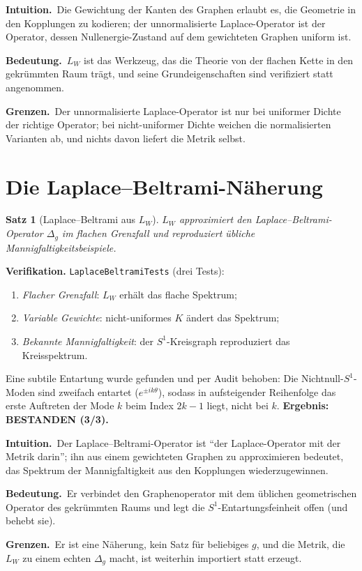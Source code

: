 \documentclass[10pt,twoside,openany]{book}
\newtheorem{theorem}{Satz}[chapter]
\newcommand{\theoremnotes}[3]{%
  \par\medskip\noindent
  \textbf{Intuition.}\ #1\par
  \textbf{Bedeutung.}\ #2\par
  \textbf{Grenzen.}\ #3\par}
\begin{document}
\theoremnotes
{Die Gewichtung der Kanten des Graphen erlaubt es, die Geometrie in den Kopplungen zu
kodieren; der unnormalisierte Laplace-Operator ist der Operator, dessen
Nullenergie-Zustand auf dem gewichteten Graphen uniform ist.}
{$L_W$ ist das Werkzeug, das die Theorie von der flachen Kette in den gekrümmten Raum
trägt, und seine Grundeigenschaften sind verifiziert statt angenommen.}
{Der unnormalisierte Laplace-Operator ist nur bei uniformer Dichte der richtige Operator;
bei nicht-uniformer Dichte weichen die normalisierten Varianten ab, und nichts davon
liefert die Metrik selbst.}

\section{Die Laplace--Beltrami-Näherung}
\label{ch:laplace-beltrami}

\begin{theorem}[Laplace--Beltrami aus $L_W$]
$L_W$ approximiert den Laplace--Beltrami-Operator $\Delta_g$ im flachen Grenzfall und
reproduziert übliche Mannigfaltigkeitsbeispiele.
\end{theorem}

\textbf{Verifikation.} \texttt{LaplaceBeltramiTests} (drei Tests):
\begin{enumerate}
\item \emph{Flacher Grenzfall}: $L_W$ erhält das flache Spektrum;
\item \emph{Variable Gewichte}: nicht-uniformes $K$ ändert das Spektrum;
\item \emph{Bekannte Mannigfaltigkeit}: der $S^1$-Kreisgraph reproduziert das
Kreisspektrum.
\end{enumerate}
Eine subtile Entartung wurde gefunden und per Audit behoben: Die Nichtnull-$S^1$-Moden
sind zweifach entartet ($e^{\pm ik\theta}$), sodass in aufsteigender Reihenfolge das
erste Auftreten der Mode $k$ beim Index $2k-1$ liegt, nicht bei $k$.
\textbf{Ergebnis: BESTANDEN (3/3).}

\theoremnotes
{Der Laplace--Beltrami-Operator ist ``der Laplace-Operator mit der Metrik darin''; ihn aus
einem gewichteten Graphen zu approximieren bedeutet, das Spektrum der Mannigfaltigkeit
aus den Kopplungen wiederzugewinnen.}
{Er verbindet den Graphenoperator mit dem üblichen geometrischen Operator des gekrümmten
Raums und legt die $S^1$-Entartungsfeinheit offen (und behebt sie).}
{Er ist eine Näherung, kein Satz für beliebiges $g$, und die Metrik, die $L_W$ zu einem
echten $\Delta_g$ macht, ist weiterhin importiert statt erzeugt.}
\end{document}
